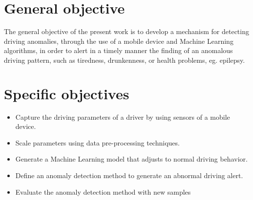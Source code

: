 \section{General objective}

The general objective of the present work is to develop a mechanism for detecting driving anomalies, through the use of a mobile device and Machine Learning algorithms, in order to alert in a timely manner the finding of an anomalous driving pattern, such as tiredness, drunkenness, or health problems, eg. epilepsy.

\section{Specific objectives}
\begin{itemize}
\item Capture the driving parameters of a driver by using sensors of a mobile device.
\item Scale parameters using data pre-processing techniques.
\item Generate a Machine Learning model that adjusts to normal driving behavior.
\item Define an anomaly detection method to generate an abnormal driving alert.
\item Evaluate the anomaly detection method with new samples


\end{itemize}

